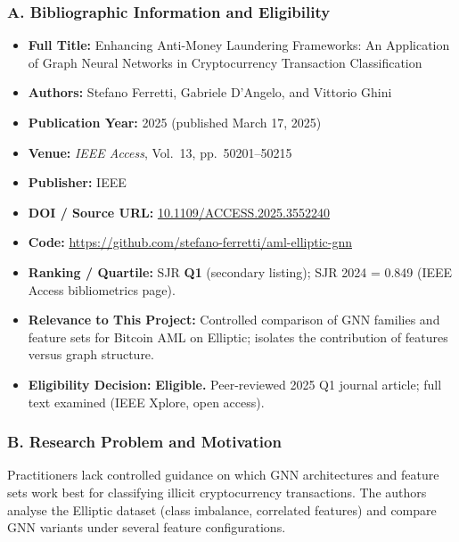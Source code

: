 \documentclass[11pt,a4paper]{article}
\begin{document}
\subsubsection*{A. Bibliographic Information and Eligibility}
\begin{itemize}[leftmargin=*]
    \item \textbf{Full Title:} Enhancing Anti-Money Laundering Frameworks: An Application of Graph Neural Networks in Cryptocurrency Transaction Classification
    \item \textbf{Authors:} Stefano Ferretti, Gabriele D'Angelo, and Vittorio Ghini
    \item \textbf{Publication Year:} 2025 (published March 17, 2025)
    \item \textbf{Venue:} \textit{IEEE Access}, Vol.~13, pp.~50201--50215
    \item \textbf{Publisher:} IEEE
    \item \textbf{DOI / Source URL:} \href{https://doi.org/10.1109/ACCESS.2025.3552240}{10.1109/ACCESS.2025.3552240}
    \item \textbf{Code:} \url{https://github.com/stefano-ferretti/aml-elliptic-gnn}
    \item \textbf{Ranking / Quartile:} SJR \textbf{Q1} (secondary listing); SJR 2024 = 0.849 (IEEE Access bibliometrics page).
    \item \textbf{Relevance to This Project:} Controlled comparison of GNN families and feature sets for Bitcoin AML on Elliptic; isolates the contribution of features versus graph structure.
    \item \textbf{Eligibility Decision:} \textbf{Eligible.} Peer-reviewed 2025 Q1 journal article; full text examined (IEEE Xplore, open access).
\end{itemize}

\subsubsection*{B. Research Problem and Motivation}
Practitioners lack controlled guidance on which GNN architectures and feature sets work best for classifying illicit cryptocurrency transactions. The authors analyse the Elliptic dataset (class imbalance, correlated features) and compare GNN variants under several feature configurations.
\end{document}

